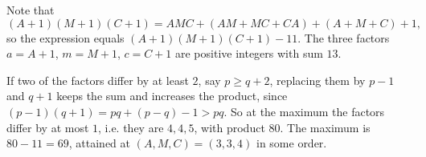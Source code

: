 Note that
\[(A+1)(M+1)(C+1)=AMC+(AM+MC+CA)+(A+M+C)+1,\]
so the expression equals $(A+1)(M+1)(C+1)-11$. The three factors $a=A+1$, $m=M+1$, $c=C+1$ are positive integers with sum $13$.

If two of the factors differ by at least $2$, say $p\ge q+2$, replacing them by $p-1$ and $q+1$ keeps the sum and increases the product, since $(p-1)(q+1)=pq+(p-q)-1>pq$. So at the maximum the factors differ by at most $1$, i.e. they are $4,4,5$, with product $80$. The maximum is $80-11=\boxed{69}$, attained at $(A,M,C)=(3,3,4)$ in some order.
